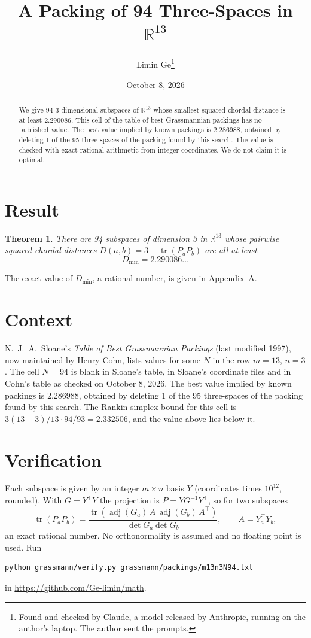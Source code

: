 \documentclass[11pt,a4paper]{article}
\title{A Packing of 94 Three-Spaces in $\mathbb{R}^{13}$}
\author{Limin Ge\thanks{Found and checked by Claude, a model released by Anthropic, running on the author's laptop. The author sent the prompts.}}
\date{October 8, 2026}
\newtheorem*{theorem}{Theorem}
\begin{document}
\maketitle
\begin{abstract}
We give 94 3-dimensional subspaces of $\mathbb{R}^{13}$ whose smallest squared chordal distance is at least 2.290086. This cell of the table of best Grassmannian packings has no published value. The best value implied by known packings is 2.286988, obtained by deleting 1 of the 95 three-spaces of the packing found by this search. The value is checked with exact rational arithmetic from integer coordinates. We do not claim it is optimal.
\end{abstract}

\section{Result}
\begin{theorem}
There are 94 subspaces of dimension 3 in $\mathbb{R}^{13}$ whose pairwise squared chordal distances $D(a,b) = 3 - \operatorname{tr}(P_aP_b)$ are all at least
\[ D_{\min} = 2.290086\ldots \]
\end{theorem}
The exact value of $D_{\min}$, a rational number, is given in Appendix~A.


\section{Context}
N.~J.~A.~Sloane's \emph{Table of Best Grassmannian Packings} (last modified 1997), now maintained by Henry Cohn, lists values for some $N$ in the row $m=13$, $n=3$. The cell $N=94$ is blank in Sloane's table, in Sloane's coordinate files and in Cohn's table as checked on October 8, 2026. The best value implied by known packings is 2.286988, obtained by deleting 1 of the 95 three-spaces of the packing found by this search. The Rankin simplex bound for this cell is $3(13-3)/13\cdot 94/93 = 2.332506$, and the value above lies below it.


\section{Verification}
Each subspace is given by an integer $m\times n$ basis $Y$ (coordinates times $10^{12}$, rounded). With $G=Y^\top Y$ the projection is $P=YG^{-1}Y^\top$, so for two subspaces
\[ \operatorname{tr}(P_aP_b)=\frac{\operatorname{tr}(\operatorname{adj}(G_a)\,A\,\operatorname{adj}(G_b)\,A^\top)}{\det G_a\det G_b},\qquad A=Y_a^\top Y_b, \]
an exact rational number. No orthonormality is assumed and no floating point is used. Run
\begin{verbatim}
python grassmann/verify.py grassmann/packings/m13n3N94.txt
\end{verbatim}
in \url{https://github.com/Ge-limin/math}.
\end{document}
